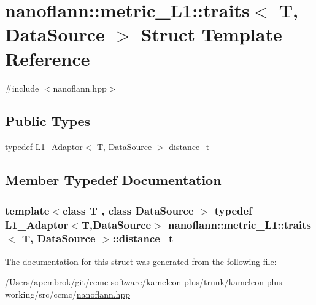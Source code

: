 \hypertarget{structnanoflann_1_1metric___l1_1_1traits}{\section{nanoflann\-:\-:metric\-\_\-\-L1\-:\-:traits$<$ T, Data\-Source $>$ Struct Template Reference}
\label{structnanoflann_1_1metric___l1_1_1traits}
}


{\ttfamily \#include $<$nanoflann.\-hpp$>$}

\subsection*{Public Types}
\begin{DoxyCompactItemize}
\item 
typedef \hyperlink{structnanoflann_1_1_l1___adaptor}{L1\-\_\-\-Adaptor}$<$ T, Data\-Source $>$ \hyperlink{structnanoflann_1_1metric___l1_1_1traits_ad665e193dcbcc2d1cca73964546f5e88}{distance\-\_\-t}
\end{DoxyCompactItemize}


\subsection{Member Typedef Documentation}
\hypertarget{structnanoflann_1_1metric___l1_1_1traits_ad665e193dcbcc2d1cca73964546f5e88}{
\subsubsection[{distance\-\_\-t}]{\setlength{\rightskip}{0pt plus 5cm}template$<$class T , class Data\-Source $>$ typedef {\bf L1\-\_\-\-Adaptor}$<$T,Data\-Source$>$ {\bf nanoflann\-::metric\-\_\-\-L1\-::traits}$<$ T, Data\-Source $>$\-::{\bf distance\-\_\-t}}}\label{structnanoflann_1_1metric___l1_1_1traits_ad665e193dcbcc2d1cca73964546f5e88}


The documentation for this struct was generated from the following file\-:\begin{DoxyCompactItemize}
\item 
/\-Users/apembrok/git/ccmc-\/software/kameleon-\/plus/trunk/kameleon-\/plus-\/working/src/ccmc/\hyperlink{nanoflann_8hpp}{nanoflann.\-hpp}\end{DoxyCompactItemize}
